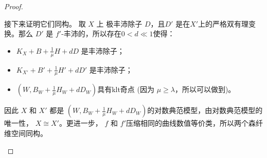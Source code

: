 \begin{proof}
\begin{enumerate}
接下来证明它们同构。 取 $X$ 上  极丰沛除子 $ D $，且$D'  $ 是在$ X' $上的严格双有理变换。那么  $ D' $ 是 $ f' $-丰沛的，所以存在$ 0<d\ll1 $使得：
          \begin{itemize}
            \item $ K_X+B+\frac{1}{\mu }H+dD $ 是丰沛除子；
            \item $ K_{X'}+B'+\frac{1}{\mu }H'+dD' $ 是丰沛除子；
            \item $(W,B_{W}+\frac{1}{\mu}H_{W}+dD_{W})$具有klt奇点 (因为 $\mu \geqslant \lambda$，所以可以做到)。
          \end{itemize}
          因此 $X$ 和 $X'$ 都是 $(W,B_{W}+\frac{1}{\mu}H_{W}+dD_{W})$的对数典范模型，由对数典范模型的唯一性， $X\cong X'$。更进一步， $f$ 和  $f'$压缩相同的曲线数值等价类，所以两个森纤维空间同构。
  \end{enumerate}
\end{proof}


